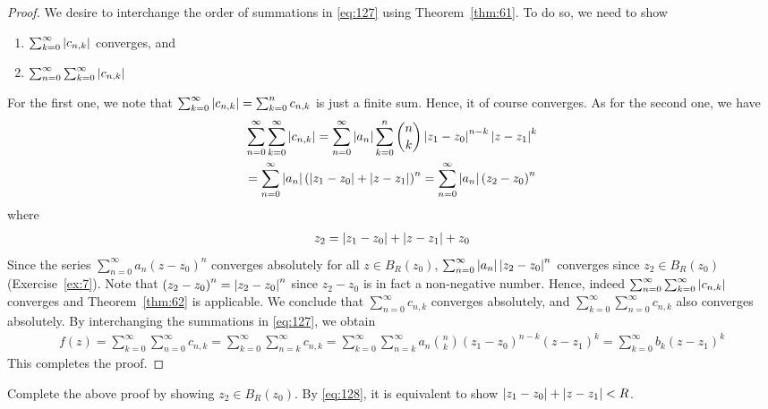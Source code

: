 \documentclass[thmcnt=section, 12pt]{my-elegantbook}
\begin{document}
\begin{proof}
    We desire to interchange the order of summations in \eqref{eq:127} using Theorem~\ref{thm:61}. To do so, we need to show
    \begin{enumerate}
        \item $\sum_{k=0}^\infty \left\lvert c_{n,k} \right\rvert$ converges, and
        \item $\sum_{n=0}^\infty \sum_{k=0}^\infty \left\lvert c_{n,k} \right\rvert$
    \end{enumerate}
    For the first one, we note that $\sum_{k=0}^\infty \left\lvert c_{n,k} \right\rvert = \sum_{k=0}^n c_{n,k}$ is just a finite sum. Hence, it of course converges. As for the second one, we have
    \begin{multline*}
        \sum_{n=0}^\infty \sum_{k=0}^\infty \left\lvert c_{n,k} \right\rvert
        = \sum_{n=0}^\infty \left\lvert a_n \right\rvert \sum_{k=0}^n \binom{n}{k} \left\lvert z_1 - z_0 \right\rvert^{n-k} \left\lvert z - z_1 \right\rvert^k \\
        = \sum_{n=0}^\infty \left\lvert a_n \right\rvert \left( \left\lvert z_1 - z_0 \right\rvert + \left\lvert z - z_1 \right\rvert \right)^n
        = \sum_{n=0}^\infty \left\lvert a_n \right\rvert \left( z_2 - z_0 \right)^n
    \end{multline*}
    where
    \begin{align}
        z_2 = \left\lvert z_1 - z_0 \right\rvert + \left\lvert z - z_1 \right\rvert + z_0
        \label{eq:128}
    \end{align}
    Since the series $\sum_{n=0}^\infty a_n (z - z_0)^n$ converges absolutely for all $z \in B_{R}(z_0)$, $\sum_{n=0}^\infty \left\lvert a_n \right\rvert \left\lvert z_2 - z_0 \right\rvert^n$ converges since $z_2 \in B_R(z_0)$ (Exercise~\ref{ex:7}). Note that $\left( z_2 - z_0 \right)^n = \left\lvert z_2 - z_0 \right\rvert^n$ since $z_2 - z_0$ is in fact a non-negative number. Hence, indeed $\sum_{n=0}^\infty \sum_{k=0}^\infty \left\lvert c_{n,k} \right\rvert$ converges and Theorem~\ref{thm:62} is applicable. We conclude that $\sum_{n=0}^\infty c_{n,k}$ converges absolutely, and $\sum_{k=0}^\infty \sum_{n=0}^\infty c_{n,k}$ also converges absolutely. By interchanging the summations in \eqref{eq:127}, we obtain
    \begin{align*}
        f(z) = \sum_{k=0}^\infty \sum_{n=0}^\infty c_{n,k}
        = \sum_{k=0}^\infty \sum_{n=k}^\infty c_{n,k}
        = \sum_{k=0}^\infty \sum_{n=k}^\infty a_n \binom{n}{k} (z_1 - z_0)^{n-k} (z - z_1)^k
        = \sum_{k=0}^\infty b_k (z - z_1)^k
    \end{align*}
    This completes the proof.
\end{proof}

\begin{exercise}
    Complete the above proof by showing $z_2 \in B_R(z_0)$. By \eqref{eq:128}, it is equivalent to show $\left\lvert z_1 - z_0 \right\rvert + \left\lvert z - z_1 \right\rvert < R$.
    \label{ex:7}
\end{exercise}
\end{document}
